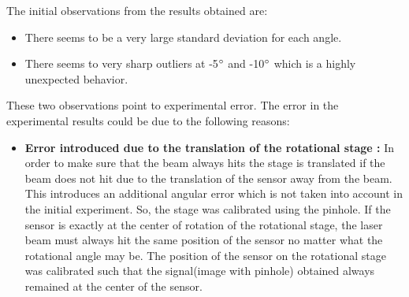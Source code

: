 The initial observations from the results obtained are:
\begin{itemize}
\item There seems to be a very large standard deviation for each angle.
\item There seems to very sharp outliers at -5$\degree$ and -10$\degree$ which is a highly unexpected behavior.
\end{itemize}
These two observations point to experimental error. The error in the experimental results could be due to the following reasons:
\begin{itemize}
\item \textbf{Error introduced due to the translation of the rotational stage :} In order to make sure that the beam always hits the stage is translated if the beam does not hit due to the translation of the sensor away from the beam. This introduces an additional angular error which is not taken into account in the initial experiment. So, the stage was calibrated using the pinhole. If the sensor is exactly at the center of rotation of the rotational stage, the laser beam must always hit the same position of the sensor no matter what the rotational angle may be. The position of the sensor on the rotational stage was calibrated such that the signal(image with pinhole) obtained always remained at the center of the sensor. 


\end{itemize}
